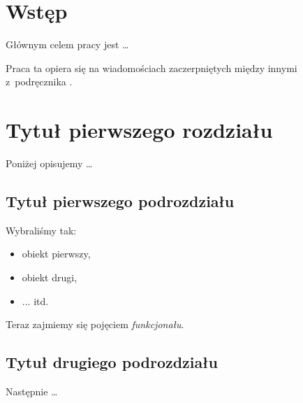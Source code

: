 \documentclass[11pt,a4paper]{report}
\begin{document}
 \begin{titlepage}
 \vspace{0.1\textheight}
 \bigskip
 \vspace{0.3\textheight}
 \par

 \vspace{0.1\textheight}
 \end{titlepage}

 \tableofcontents

 \chapter*{Wstęp}

 Głównym celem pracy jest \ldots
 \par
 Praca ta opiera się na wiadomościach zaczerpniętych między innymi
 z~podręcznika \cite{panek}.

 \chapter{Tytuł pierwszego rozdziału}
 Poniżej opisujemy \dots

 \section{Tytuł pierwszego podrozdziału}\label{sec:wybor}
 Wybraliśmy tak:
 \begin{itemize}
 \item
 obiekt pierwszy,
 \item
 obiekt drugi,
 \item
 ... itd.
 \end{itemize}
 Teraz zajmiemy się pojęciem \emph{funkcjonału}.\label{poj:funkcjonal}
 \section{Tytuł drugiego podrozdziału}\label{sec:nastepnie}
 Następnie \ldots
\end{document}
